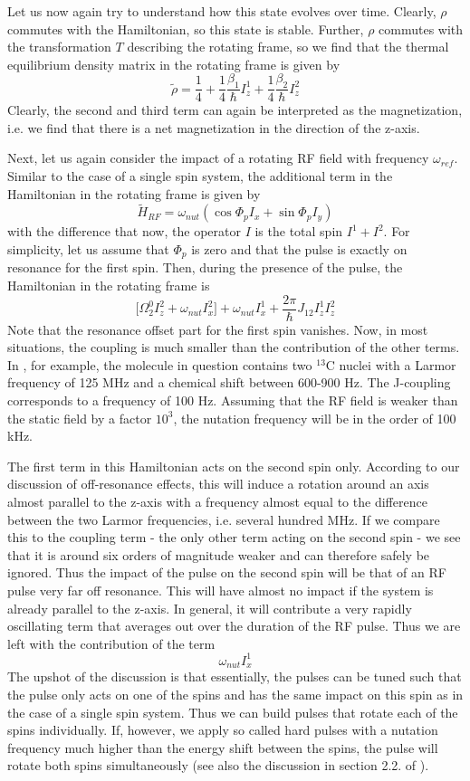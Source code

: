 \documentclass[a4paper, draft]{article}
\theoremstyle{own}
\theoremstyle{remark}
\begin{document}
Let us now again try to understand how this state evolves over time. Clearly, $\rho$ commutes with the Hamiltonian, so this state is stable. Further, $\rho$ commutes with the transformation $T$ describing the rotating frame, so we find that the thermal equilibrium density matrix in the rotating frame is given by
$$
\widetilde{\rho} = \frac{1}{4} + \frac{1}{4} \frac{\beta_1}{\hbar} I_z^1 + \frac{1}{4} \frac{\beta_2}{\hbar} I_z^2
$$
Clearly, the second and third term can again be interpreted as the magnetization, i.e. we find that there is a net magnetization in the direction of the z-axis.


Next, let us again consider the impact of a rotating RF field with frequency $\omega_{ref}$. Similar to the case of a single spin system, the additional term in the Hamiltonian in the rotating frame is given by
$$
\widetilde{H}_{RF} =  \omega_{nut} ( \cos \Phi_p I_x + \sin \Phi_p I_y)
$$
with the difference that now, the operator $I$ is the total spin $I^1 + I^2$. For simplicity, let us assume that $\Phi_p$ is zero and that the pulse is exactly on resonance for the first spin. Then, during the presence of the pulse, the Hamiltonian in the rotating frame is
$$
\big[  \Omega^0_2 I_z^2 + \omega_{nut} I_x^2 \big] + \omega_{nut} I_x^1  + \frac{2 \pi}{\hbar} J_{12} I_z^1 I_z^2 
$$
Note that the resonance offset part for the first spin vanishes. Now, in most situations, the coupling is much smaller than the contribution of the other terms. In \cite{NMRReview}, for example, the molecule in question contains two ${}^{13}$C nuclei with a Larmor frequency of 125 MHz and a chemical shift between 600-900 Hz. The J-coupling corresponds to a frequency of 100 Hz. Assuming that the RF field is weaker than the static field by a factor $10^3$, the nutation frequency will be in the order of 100 kHz. 

The first term in this Hamiltonian acts on the second spin only. According to our discussion of off-resonance effects, this will induce a rotation around an axis almost parallel to the z-axis with a frequency almost equal to the difference between the two Larmor frequencies, i.e. several hundred MHz. If we compare this to the coupling term - the only other term acting on the second spin - we see that it is around six orders of magnitude weaker and can therefore safely be ignored. Thus the impact of the pulse on the second spin will be that of an RF pulse very far off resonance. This will have almost no impact if the system is already parallel to the z-axis. In general, it will contribute a very rapidly oscillating term that averages out over the duration of the RF pulse. Thus we are left with the contribution of the term
$$
\omega_{nut} I_x^1
$$
The upshot of the discussion is that essentially, the pulses can be tuned such that the pulse only acts on one of the spins and has the same impact on this spin as in the case of a single spin system. Thus we can build pulses that rotate each of the spins individually. If, however, we apply so called hard pulses with a nutation frequency much higher than the energy shift between the spins, the pulse will rotate both spins simultaneously (see also the discussion in section 2.2. of \cite{NMRReview}).
\end{document}
